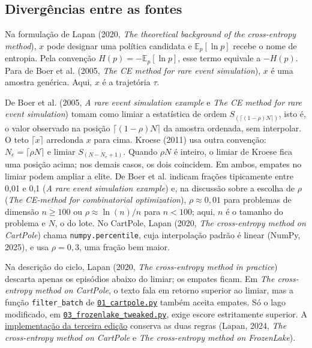 \documentclass[12pt]{article}
\begin{document}
\subsection{Divergências entre as fontes}

Na formulação de Lapan (2020, \emph{The theoretical background of the cross-entropy method}), $x$ pode designar uma política candidata e $\mathbb E_p[\ln p]$ recebe o nome de entropia. Pela convenção $H(p)=-\mathbb E_p[\ln p]$, esse termo equivale a $-H(p)$. Para de Boer et al. (2005, \emph{The CE method for rare event simulation}), $x$ é uma amostra genérica. Aqui, $x$ é a trajetória $\tau$.

De Boer et al. (2005, \emph{A rare event simulation example} e \emph{The CE method for rare event simulation}) tomam como limiar a estatística de ordem $S_{(\lceil(1-\rho)N\rceil)}$, isto é, o valor observado na posição $\lceil(1-\rho)N\rceil$ da amostra ordenada, sem interpolar. O teto $\lceil x\rceil$ arredonda $x$ para cima. Kroese (2011) usa outra convenção: $N_e=\lceil\rho N\rceil$ e limiar $S_{(N-N_e+1)}$. Quando $\rho N$ é inteiro, o limiar de Kroese fica uma posição acima; nos demais casos, os dois coincidem. Em ambos, empates no limiar podem ampliar a elite. De Boer et al. indicam frações tipicamente entre 0,01 e 0,1 (\emph{A rare event simulation example}) e, na discussão sobre a escolha de $\rho$ (\emph{The CE-method for combinatorial optimization}), $\rho\approx0{,}01$ para problemas de dimensão $n\ge100$ ou $\rho\approx\ln(n)/n$ para $n<100$; aqui, $n$ é o tamanho do problema e $N$, o do lote. No CartPole, Lapan (2020, \emph{The cross-entropy method on CartPole}) chama \texttt{numpy.percentile}, cuja interpolação padrão é linear (NumPy, 2025), e usa $\rho=0{,}3$, uma fração bem maior.

Na descrição do ciclo, Lapan (2020, \emph{The cross-entropy method in practice}) descarta apenas os episódios abaixo do limiar; os empates ficam. Em \emph{The cross-entropy method on CartPole}, o texto fala em retorno superior ao limiar, mas a função \texttt{filter\_batch} de \href{https://github.com/PacktPublishing/Deep-Reinforcement-Learning-Hands-On-Second-Edition/blob/master/Chapter04/01_cartpole.py}{\texttt{01\_cartpole.py}} também aceita empates. Só o lago modificado, em \href{https://github.com/PacktPublishing/Deep-Reinforcement-Learning-Hands-On-Second-Edition/blob/master/Chapter04/03_frozenlake_tweaked.py}{\texttt{03\_frozenlake\_tweaked.py}}, exige escore estritamente superior. A \href{https://github.com/PacktPublishing/Deep-Reinforcement-Learning-Hands-On-Third-Edition/tree/main/Chapter04}{implementação da terceira edição} conserva as duas regras (Lapan, 2024, \emph{The cross-entropy method on CartPole} e \emph{The cross-entropy method on FrozenLake}).
\end{document}
